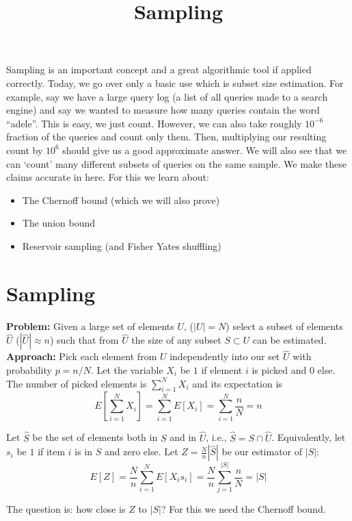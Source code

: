 \documentclass{article}
\title{Sampling} %
\begin{document}
\maketitle

Sampling is an important concept and a great algorithmic tool if applied correctly.
Today, we go over only a basic use which is subset size estimation.
For example, say we have a large query log (a list of all queries made to a search engine)
and say we wanted to measure how many queries contain the word ``adele''.
This is easy, we just count. 
However, we can also take roughly $10^{-6}$ fraction of the queries and count only them.
Then, multiplying our resulting count by $10^{6}$ should give us a good approximate answer.
We will also see that we can `count' many different subsets of queries on the same sample.
We make these claims accurate in here.
For this we learn about:
\begin{itemize}
\item The Chernoff bound (which we will also prove)
\item The union bound 
\item Reservoir sampling (and Fisher Yates shuffling)
\end{itemize}

\section{Sampling}

{\bf Problem:} Given a large set of elements $U$, ($|U|=N$) select a subset of elements 
$\hat{U}$ ($|\hat{U}| \approx n$) such that from 
$\hat{U}$ the size of any subset $S \subset U$ can be estimated.\\
{\bf Approach:} Pick each element from $U$ independently into our set $\hat{U}$ with probability $p = n/N$.
Let the variable $X_i$ be $1$ if element $i$ is picked and $0$ else.
The number of picked elements is $\sum_{i=1}^{N} X_i$ and its expectation is 
$$E[\sum_{i=1}^{N} X_i] = \sum_{i=1}^{N}E[X_i] = \sum_{i=1}^{N}\frac{n}{N} = n$$

Let $\hat{S}$ be the set of elements both in $S$ and in $\hat{U}$, i.e., $\hat{S} =  S \cap \hat{U}$. 
Equivalently, let $s_i$ be $1$ if item $i$ is in $S$ and zero else. 
Let $Z = \frac{N}{n}|\hat{S}|$ be our estimator of $|S|$:
\[
E[Z] = \frac{N}{n}\sum_{i=1}^{N}E[X_i s_i] = \frac{N}{n}\sum_{j=1}^{|S|} \frac{n}{N} =  |S|
\]

\noindent The question is: how close is $Z$ to $|S|$? For this we need the Chernoff bound.
\end{document}
